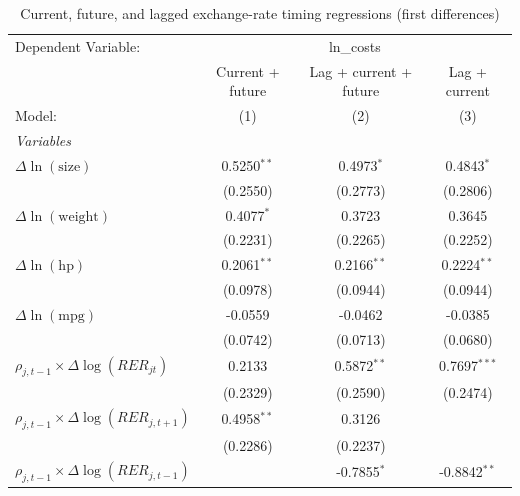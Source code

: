 
\begin{table}[htbp]
   \caption{\label{tab:cost_reg_timing_triplet_fd} Current, future, and lagged exchange-rate timing regressions (first differences)}
   \centering
   \begin{tabular}{lccc}
      \tabularnewline \midrule \midrule
      Dependent Variable: & \multicolumn{3}{c}{ln\_costs}\\
                                                      & Current + future & Lag + current + future & Lag + current \\
      Model:                                          & (1)            & (2)            & (3)\\
      \midrule
      \emph{Variables}\\
      $\Delta\ln(\text{size})$                        & 0.5250$^{**}$    & 0.4973$^{*}$           & 0.4843$^{*}$\\
                                                      & (0.2550)         & (0.2773)               & (0.2806)\\
      $\Delta\ln(\text{weight})$                      & 0.4077$^{*}$     & 0.3723                 & 0.3645\\
                                                      & (0.2231)         & (0.2265)               & (0.2252)\\
      $\Delta\ln(\text{hp})$                          & 0.2061$^{**}$    & 0.2166$^{**}$          & 0.2224$^{**}$\\
                                                      & (0.0978)         & (0.0944)               & (0.0944)\\
      $\Delta\ln(\text{mpg})$                         & -0.0559          & -0.0462                & -0.0385\\
                                                      & (0.0742)         & (0.0713)               & (0.0680)\\
      $\rho_{j,t-1}\times\Delta\log(RER_{jt})$        & 0.2133           & 0.5872$^{**}$          & 0.7697$^{***}$\\
                                                      & (0.2329)         & (0.2590)               & (0.2474)\\
      $\rho_{j,t-1}\times\Delta\log(RER_{j,t+1})$     & 0.4958$^{**}$    & 0.3126                 &   \\
                                                      & (0.2286)         & (0.2237)               &   \\
      $\rho_{j,t-1}\times\Delta\log(RER_{j,t-1})$     &                  & -0.7855$^{*}$          & -0.8842$^{**}$\\

\end{tabular}
\end{table}
